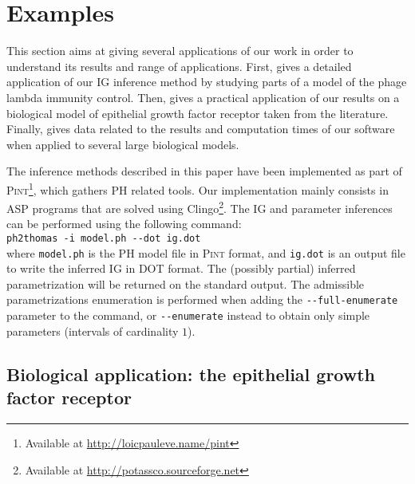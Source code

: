 \section{Examples}\label{sec:examples}

This section aims at giving several applications of our work in order to
understand its results and range of applications.
First,  gives a detailed application of our IG inference method
by studying parts of a model of the phage lambda immunity control.
Then,  gives a practical application of our results on a biological model
of epithelial growth factor receptor taken from the literature.
Finally,  gives data related to the results and computation times of our software
when applied to several large biological models.

\medskip

The inference methods described in this paper have been implemented as part of
\textsc{Pint}\footnote{Available at \url{http://loicpauleve.name/pint}}, which gathers PH related tools.
Our implementation mainly consists in ASP programs that are solved using
Clingo\footnote{Available at \url{http://potassco.sourceforge.net}}.
The IG and parameter inferences can be performed using the following command:\\
  \hspace*{\parindent}\texttt{ph2thomas -i model.ph -{}-dot ig.dot}\\
where \texttt{model.ph} is the PH model file in \textsc{Pint} format,
and \texttt{ig.dot} is an output file to write the inferred IG in DOT format.
The (possibly partial) inferred parametrization will be returned on the standard output.
The admissible parametrizations enumeration is performed when adding the \texttt{-{}-full-enumerate} parameter to the command,
or \texttt{-{}-enumerate} instead to obtain only simple parameters (intervals of cardinality $1$).







\subsection{Biological application: the epithelial growth factor receptor}\label{ssec:appli}

